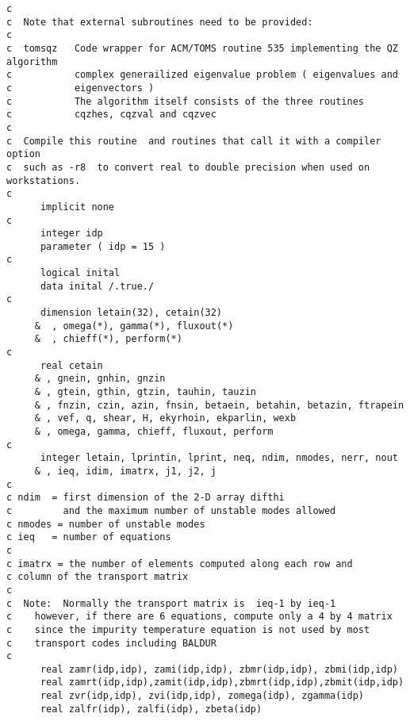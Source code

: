 \begin{verbatim}
c
c  Note that external subroutines need to be provided:
c
c  tomsqz   Code wrapper for ACM/TOMS routine 535 implementing the QZ algorithm
c           complex generailized eigenvalue problem ( eigenvalues and 
c           eigenvectors ) 
c           The algorithm itself consists of the three routines 
c           cqzhes, cqzval and cqzvec
c
c  Compile this routine  and routines that call it with a compiler option 
c  such as -r8  to convert real to double precision when used on workstations.
c
      implicit none
c
      integer idp
      parameter ( idp = 15 )
c
      logical inital
      data inital /.true./
c
      dimension letain(32), cetain(32)
     &  , omega(*), gamma(*), fluxout(*)
     &  , chieff(*), perform(*)
c
      real cetain
     & , gnein, gnhin, gnzin
     & , gtein, gthin, gtzin, tauhin, tauzin
     & , fnzin, czin, azin, fnsin, betaein, betahin, betazin, ftrapein
     & , vef, q, shear, H, ekyrhoin, ekparlin, wexb
     & , omega, gamma, chieff, fluxout, perform
c
      integer letain, lprintin, lprint, neq, ndim, nmodes, nerr, nout
     & , ieq, idim, imatrx, j1, j2, j
c
c ndim  = first dimension of the 2-D array difthi
c         and the maximum number of unstable modes allowed
c nmodes = number of unstable modes
c ieq   = number of equations
c
c imatrx = the number of elements computed along each row and
c column of the transport matrix
c
c  Note:  Normally the transport matrix is  ieq-1 by ieq-1
c    however, if there are 6 equations, compute only a 4 by 4 matrix
c    since the impurity temperature equation is not used by most
c    transport codes including BALDUR
c
      real zamr(idp,idp), zami(idp,idp), zbmr(idp,idp), zbmi(idp,idp)
      real zamrt(idp,idp),zamit(idp,idp),zbmrt(idp,idp),zbmit(idp,idp)
      real zvr(idp,idp), zvi(idp,idp), zomega(idp), zgamma(idp)
      real zalfr(idp), zalfi(idp), zbeta(idp)


\end{verbatim}
